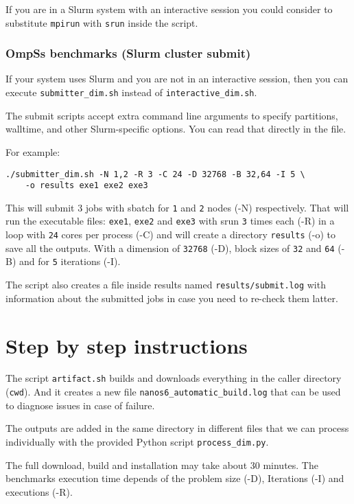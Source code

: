 \documentclass{article}
\newcommand{\code}[1]{\texttt{#1}}
\begin{document}
If you are in a Slurm system with an interactive session you could
consider to substitute \code{mpirun} with \code{srun} inside the
script.

\subsubsection{OmpSs benchmarks (Slurm cluster submit)}\label{SUBMIT}

If your system uses Slurm and you are not in an interactive session,
then you can execute \code{submitter\_dim.sh} instead of
\code{interactive\_dim.sh}.

The submit scripts accept extra command line arguments to specify
partitions, walltime, and other Slurm-specific options. You can read
that directly in the file.

For example:

\begin{lstlisting}
./submitter_dim.sh -N 1,2 -R 3 -C 24 -D 32768 -B 32,64 -I 5 \
	-o results exe1 exe2 exe3
\end{lstlisting}

This will submit 3 jobs with sbatch for \code{1} and \code{2} nodes
(-N) respectively. That will run the executable files: \code{exe1},
\code{exe2} and \code{exe3} with srun \code{3} times each (-R) in a
loop with \code{24} cores per process (-C) and will create a directory
\code{results} (-o) to save all the outputs. With a dimension of
\code{32768} (-D), block sizes of \code{32} and \code{64} (-B) and for
\code{5} iterations (-I).

The script also creates a file inside results named
\code{results/submit.log} with information about the submitted jobs in
case you need to re-check them latter.

\section{Step by step instructions}\label{SBS}

The script \code{artifact.sh} builds and downloads everything in the
caller directory (\code{cwd}). And it creates a new file
\code{nanos6\_automatic\_build.log} that can be used to diagnose
issues in case of failure.

The outputs are added in the same directory in different files that we
can process individually with the provided Python script
\code{process\_dim.py}.

The full download, build and installation may take about 30
minutes. The benchmarks execution time depends of the problem size
(-D), Iterations (-I) and executions (-R).
\end{document}
